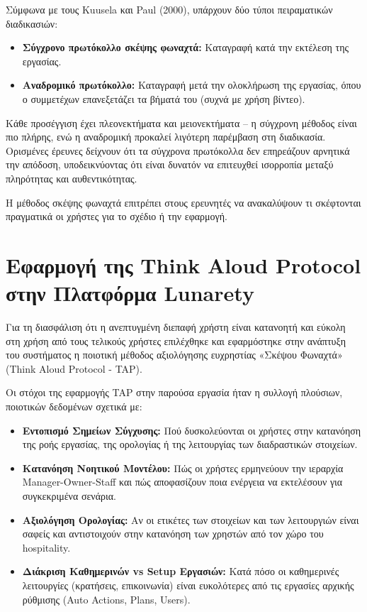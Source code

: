 \documentclass[
	12pt, %
	oneside, %
	greek,
	onehalfspacing, %
	liststotoc, %
	toctotoc, %
	parskip, %
	headsepline, %
]{MastersDoctoralThesis} %
\begin{document}
Σύμφωνα με τους Kuusela και Paul (2000), υπάρχουν δύο τύποι πειραματικών διαδικασιών:

\begin{itemize}
    \item \textbf{Σύγχρονο πρωτόκολλο σκέψης φωναχτά:} Καταγραφή κατά την εκτέλεση της εργασίας.
    \item \textbf{Αναδρομικό πρωτόκολλο:} Καταγραφή μετά την ολοκλήρωση της εργασίας, όπου ο συμμετέχων επανεξετάζει τα βήματά του (συχνά με χρήση βίντεο).
\end{itemize}

Κάθε προσέγγιση έχει πλεονεκτήματα και μειονεκτήματα – η σύγχρονη μέθοδος είναι πιο πλήρης, ενώ η αναδρομική προκαλεί λιγότερη παρέμβαση στη διαδικασία. Ορισμένες έρευνες δείχνουν ότι τα σύγχρονα πρωτόκολλα δεν επηρεάζουν αρνητικά την απόδοση, υποδεικνύοντας ότι είναι δυνατόν να επιτευχθεί ισορροπία μεταξύ πληρότητας και αυθεντικότητας.

Η μέθοδος σκέψης φωναχτά επιτρέπει στους ερευνητές να ανακαλύψουν τι σκέφτονται πραγματικά οι χρήστες για το σχέδιο ή την εφαρμογή.

\section{Εφαρμογή της Think Aloud Protocol στην Πλατφόρμα Lunarety}
\label{sec:tap-application}

Για τη διασφάλιση ότι η ανεπτυγμένη διεπαφή χρήστη είναι κατανοητή και εύκολη στη χρήση από τους τελικούς χρήστες επιλέχθηκε και εφαρμόστηκε στην ανάπτυξη του συστήματος η ποιοτική μέθοδος αξιολόγησης ευχρηστίας «Σκέψου Φωναχτά» (Think Aloud Protocol - TAP).

Οι στόχοι της εφαρμογής TAP στην παρούσα εργασία ήταν η συλλογή πλούσιων, ποιοτικών δεδομένων σχετικά με:

\begin{itemize}
    \item \textbf{Εντοπισμό Σημείων Σύγχυσης:} Πού δυσκολεύονται οι χρήστες στην κατανόηση της ροής εργασίας, της ορολογίας ή της λειτουργίας των διαδραστικών στοιχείων.
    \item \textbf{Κατανόηση Νοητικού Μοντέλου:} Πώς οι χρήστες ερμηνεύουν την ιεραρχία Manager-Owner-Staff και πώς αποφασίζουν ποια ενέργεια να εκτελέσουν για συγκεκριμένα σενάρια.
    \item \textbf{Αξιολόγηση Ορολογίας:} Αν οι ετικέτες των στοιχείων και των λειτουργιών είναι σαφείς και αντιστοιχούν στην κατανόηση των χρηστών από τον χώρο του hospitality.
    \item \textbf{Διάκριση Καθημερινών vs Setup Εργασιών:} Κατά πόσο οι καθημερινές λειτουργίες (κρατήσεις, επικοινωνία) είναι ευκολότερες από τις εργασίες αρχικής ρύθμισης (Auto Actions, Plans, Users).
\end{itemize}
\end{document}
